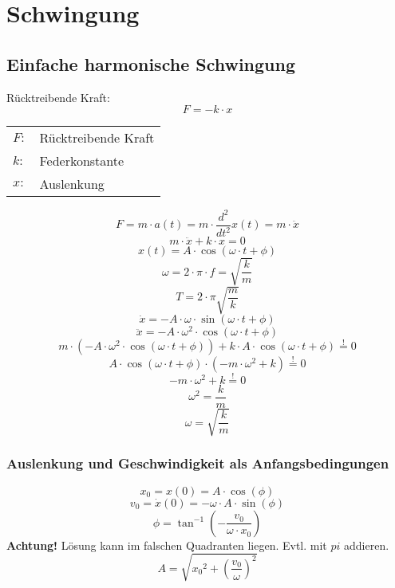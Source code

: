 



\chapter{Schwingung}
\section{Einfache harmonische Schwingung}
Rücktreibende Kraft: 
\[ \boxed{F = - k \cdot x} \]
\begin{tabular}{ll}
$F:$ & Rücktreibende Kraft \\
$k:$ & Federkonstante \\
$x:$ & Auslenkung
\end{tabular}
\[ \boxed{F = m \cdot a(t) = m \cdot \frac{d^2}{d t^2}x(t) = m \cdot \ddot{x}} \]
\[ \boxed{m \cdot \ddot{x} + k \cdot x = 0} \]
\[ \boxed{x(t) = A \cdot \cos(\omega \cdot t + \phi)} \]
\[ \boxed{\omega = 2 \cdot \pi \cdot f = \sqrt{\frac{k}{m}}} \]
\[ \boxed{T = 2 \cdot \pi \sqrt{\frac{m}{k}}} \]
\[ \boxed{\dot{x} = - A \cdot \omega \cdot \sin(\omega \cdot t + \phi)} \]
\[ \boxed{\ddot{x} = - A \cdot \omega^2 \cdot \cos(\omega \cdot t + \phi)} \]
\[ \boxed{m \cdot (-A \cdot \omega^2 \cdot \cos(\omega \cdot t + \phi)) 
+ k \cdot A \cdot \cos(\omega \cdot t + \phi) \stackrel{!}{=} 0} \]
\[ \boxed{A \cdot \cos(\omega \cdot t + \phi) \cdot (-m \cdot  \omega^2 + k) 
\stackrel{!}{=} 0} \]
\[ \boxed{-m \cdot  \omega^2 + k \stackrel{!}{=} 0} \]
\[ \boxed{\omega^2 = \frac{k}{m}} \]
\[ \boxed{\omega = \sqrt{\frac{k}{m}}} \]

\subsection{Auslenkung und Geschwindigkeit als Anfangsbedingungen}
\[ \boxed{x_0 = x(0) = A \cdot \cos(\phi)} \]
\[ \boxed{v_0 = \dot{x}(0) = - \omega \cdot A \cdot \sin(\phi)} \]
\[ \boxed{\phi = \tan^{-1}\left(-\frac{v_0}{\omega \cdot x_0}\right)} \]
\textbf{Achtung!} Lösung kann im falschen Quadranten liegen. 
Evtl. mit $pi$ addieren. 
\[ \boxed{A = \sqrt{{x_0}^2 + \left(\frac{v_0}{\omega}\right)^2}} \]


